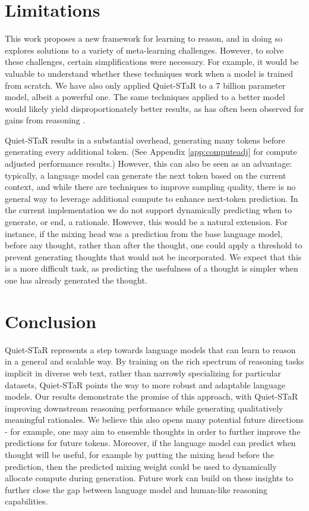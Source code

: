 \documentclass{article} %
\begin{document}
\vspace{-5px}
\section{Limitations}\vspace{-3px}
This work proposes a new framework for learning to reason, and in doing so explores solutions to a variety of meta-learning challenges. However, to solve these challenges, certain simplifications were necessary. For example, it would be valuable to understand whether these techniques work when a model is trained from scratch. 
We have also only applied Quiet-STaR to a 7 billion parameter model, albeit a powerful one. The same techniques applied to a better model would likely yield disproportionately better results, as has often been observed for gains from reasoning \citep{wei_emergent_2022}.

Quiet-STaR results in a substantial overhead, generating many tokens before generating every additional token.
(See Appendix \ref{app:computeadj} for compute adjusted performance results.)
However, this can also be seen as an advantage: typically, a language model can generate the next token based on the current context, and while there are techniques to improve sampling quality, there is no general way to leverage additional compute to enhance next-token prediction. 
In the current implementation we do not support dynamically predicting when to generate, or end, a rationale. However, this would be a natural extension.
For instance, if the mixing head was a prediction from the base language model, before any thought, rather than after the thought, one could apply a threshold to prevent generating thoughts that would not be incorporated. We expect that this is a more difficult task, as predicting the usefulness of a thought is simpler when one has already generated the thought.

\section{Conclusion}\vspace{-3px}
Quiet-STaR represents a step towards language models that can learn to reason in a general and scalable way. By training on the rich spectrum of reasoning tasks implicit in diverse web text, rather than narrowly specializing for particular datasets, Quiet-STaR points the way to more robust and adaptable language models. Our results demonstrate the promise of this approach, with Quiet-STaR improving downstream reasoning performance while generating qualitatively meaningful rationales. We believe this also opens many potential future directions - for example, one may aim to ensemble thoughts in order to further improve the predictions for future tokens. Moreover, if the language model can predict when thought will be useful, for example by putting the mixing head before the prediction, then the predicted mixing weight could be used to dynamically allocate compute during generation. Future work can build on these insights to further close the gap between language model and human-like reasoning capabilities.
\end{document}
